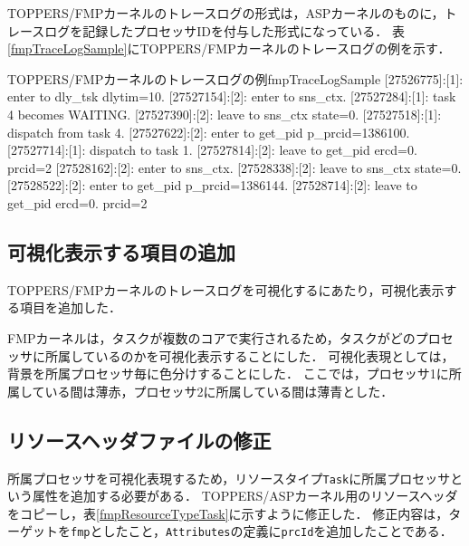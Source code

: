TOPPERS/FMPカーネルのトレースログの形式は，ASPカーネルのものに，トレースログを記録したプロセッサIDを付与した形式になっている．
表\ref{fmpTraceLogSample}にTOPPERS/FMPカーネルのトレースログの例を示す．

\begin{File}{TOPPERS/FMPカーネルのトレースログの例}{fmpTraceLogSample}
[27526775]:[1]: enter to dly_tsk dlytim=10.
[27527154]:[2]: enter to sns_ctx.
[27527284]:[1]: task 4 becomes WAITING.
[27527390]:[2]: leave to sns_ctx state=0.
[27527518]:[1]: dispatch from task 4.
[27527622]:[2]: enter to get_pid p_prcid=1386100.
[27527714]:[1]: dispatch to task 1.
[27527814]:[2]: leave to get_pid ercd=0. prcid=2
[27528162]:[2]: enter to sns_ctx.
[27528338]:[2]: leave to sns_ctx state=0.
[27528522]:[2]: enter to get_pid p_prcid=1386144.
[27528714]:[2]: leave to get_pid ercd=0. prcid=2
\end{File}

\subsection{可視化表示する項目の追加}
\label{subsec421}

TOPPERS/FMPカーネルのトレースログを可視化するにあたり，可視化表示する項目を追加した．

FMPカーネルは，タスクが複数のコアで実行されるため，タスクがどのプロセッサに所属しているのかを可視化表示することにした．
可視化表現としては，背景を所属プロセッサ毎に色分けすることにした．
ここでは，プロセッサ1に所属している間は薄赤，プロセッサ2に所属している間は薄青とした．

\subsection{リソースヘッダファイルの修正}

所属プロセッサを可視化表現するため，リソースタイプ{\tt Task}に所属プロセッサという属性を追加する必要がある．
TOPPERS/ASPカーネル用のリソースヘッダをコピーし，表\ref{fmpResourceTypeTask}に示すように修正した．
修正内容は，ターゲットを{\tt fmp}としたこと，{\tt Attributes}の定義に{\tt prcId}を追加したことである．

\begin{File}{TOPPERS/FMPカーネル用リソースヘッダファイルの一部}{fmpResourceTypeTask}
{
  "fmp":
  {
    "Task":{
      "DisplayName" :"タスク",
      "Attributes" :{
        "prcId":{
          "VariableType"  :"Number",
          "DisplayName"  :"プロセッサID",
          "AllocationType":"Dynamic",
          "CanGrouping"  :true
        },
        ...
\end{File}

